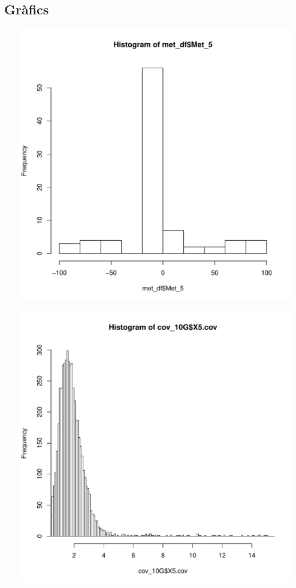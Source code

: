 \documentclass{article}\usepackage[]{graphicx}\usepackage[]{color}
\newenvironment{knitrout}{}{} %
\begin{document}
\subsection{Gràfics}
\begin{knitrout}
\color{fgcolor}

{\centering \includegraphics[width=20cm,height=12cm]{figure/minimal-cor_plots1-1} 

}



\end{knitrout}
\clearpage
\begin{knitrout}
\color{fgcolor}

{\centering \includegraphics[width=20cm,height=12cm]{figure/minimal-cor_plots2-1} 

}



\end{knitrout}
\end{document}
